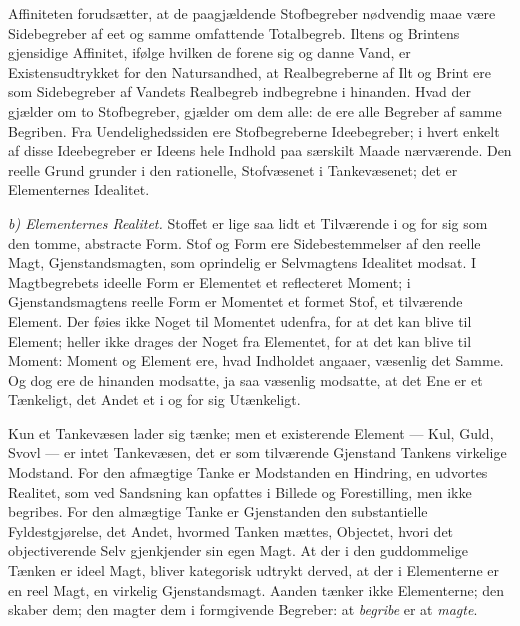 \documentclass[12pt,a4paper]{book}
\newcommand{\runin}[1]{\emph{#1}\hspace{0.4em}}
\begin{document}
Affiniteten forudsætter, at de paagjældende Stofbegreber nødvendig maae
være Sidebegreber af eet og samme omfattende Totalbegreb. Iltens og
Brintens gjensidige Affinitet, ifølge hvilken de forene sig og danne Vand,
er Existensudtrykket for den Natursandhed, at Realbegreberne af Ilt og
Brint ere som Sidebegreber af Vandets Realbegreb indbegrebne i hinanden.
Hvad der gjælder om to Stofbegreber, gjælder om dem alle: de ere alle
Begreber af samme Begriben. Fra Uendelighedssiden ere Stofbegreberne
Ideebegreber; i hvert enkelt af disse Ideebegreber er Ideens hele Indhold
paa særskilt Maade nærværende. Den reelle Grund grunder i den rationelle,
Stofvæsenet i Tankevæsenet; det er Elementernes Idealitet.

\runin{b) Elementernes Realitet.} Stoffet er lige saa lidt et Tilværende i
og for sig som den tomme, abstracte Form. Stof og Form ere
Sidebestemmelser af den reelle Magt, Gjenstandsmagten, som oprindelig er
Selvmagtens Idealitet modsat. I Magtbegrebets ideelle Form er Elementet et
reflecteret Moment; i Gjenstandsmagtens reelle Form er Momentet et formet
Stof, et tilværende Element. Der føies ikke Noget til Momentet udenfra,
for at det kan blive til Element; heller ikke drages der Noget fra
Elementet, for at det kan blive til Moment: Moment og Element ere, hvad
Indholdet angaaer,
væsenlig det Samme. Og dog ere de hinanden modsatte, ja saa væsenlig
modsatte, at det Ene er et Tænkeligt, det Andet et i og for sig
Utænkeligt.

Kun et Tankevæsen lader sig tænke; men et existerende Element --- Kul,
Guld, Svovl --- er intet Tankevæsen, det er som tilværende Gjenstand
Tankens virkelige Modstand. For den afmægtige Tanke er Modstanden en
Hindring, en udvortes Realitet, som ved Sandsning kan opfattes i Billede
og Forestilling, men ikke begribes. For den almægtige Tanke er Gjenstanden
den substantielle Fyldestgjørelse, det Andet, hvormed Tanken mættes,
Objectet, hvori det objectiverende Selv gjenkjender sin egen Magt. At der
i den guddommelige Tænken er ideel Magt, bliver kategorisk udtrykt derved,
at der i Elementerne er en reel Magt, en virkelig Gjenstandsmagt. Aanden
tænker ikke Elementerne; den skaber dem; den magter dem i formgivende
Begreber: at \emph{begribe} er at \emph{magte}.
\end{document}
